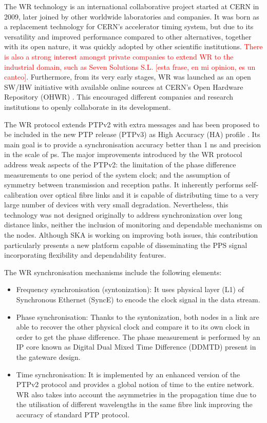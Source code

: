 The WR technology \cite{Wlostowski2011} is an international collaborative
project started at CERN in 2009, later joined by other worldwide laboratories and
companies. It was born as a replacement technology for CERN's accelerator timing system,
but due to its versatility and improved performance compared to other
alternatives, together with its open nature, it was quickly adopted by other
scientific institutions. \textcolor{red}{There is also a strong interest amongst private companies to
extend WR to the industrial domain, such as Seven Solutions S.L. \cite{sevensols:wr} [esta frase, en mi opinion, es un canteo]}.
Furthermore, from its very early stages, WR was launched as an open SW/HW
initiative with available online sources at CERN's Open Hardware Repository (OHWR)
\cite{ohwr:repo}. This encouraged different companies and research institutions
to openly collaborate in its development.

The WR protocol extends PTPv2 with extra messages and has been proposed to be
included in the new PTP release (PTPv3) as High Accuracy (HA) profile
\cite{wr:maciej-ptpv3-standard} . Its main goal is to provide a synchronisation
accuracy better than 1 ns and precision in the scale of ps. The major
improvements introduced by the WR protocol address weak aspects of the PTPv2:
the limitation of the phase difference measurements to one period of the system
clock; and the assumption of symmetry between transmission and reception
paths. It inherently performs self-calibration over optical fibre links and it
is capable of distributing time to a very large number of devices with very
small degradation. Nevertheless, this technology was not designed originally
to address synchronization over long distance links, neither the inclusion of monitoring and dependable
mechanisms on the nodes. Although SKA is working on improving both issues, this contribution
particularly presents a new platform capable of disseminating the PPS signal incorporating flexibility and dependability features.  

The WR synchronisation mechanisms include the following elements:

\begin{itemize} \item {Frequency synchronisation (syntonization): It uses
		physical layer (L1) of Synchronous Ethernet (SyncE) to encode
	the clock signal in the data stream. } \item {Phase synchronisation:
		Thanks to the syntonization, both nodes in a link are able to
		recover the other physical clock and compare it to its own clock
		in order to get the phase difference. The phase measurement is
		performed by an IP core known as Digital Dual Mixed Time
		Difference (DDMTD) present in the gateware design.} \item {Time
			synchronisation: It is implemented by an enhanced
			version of the PTPv2 protocol and provides a global
			notion of time to the entire network. WR also takes into
			account the asymmetries in the propagation time due to
			the utilisation of different wavelengths in the same
			fibre link improving the accuracy of standard PTP
			protocol.} \end{itemize}

